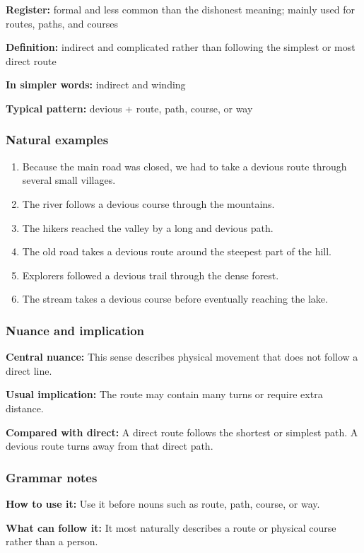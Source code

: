 \documentclass[11pt]{article}
\begin{document}
\textbf{Register:} formal and less common than the dishonest meaning; mainly used for routes, paths, and courses

\textbf{Definition:} indirect and complicated rather than following the simplest or most direct route

\textbf{In simpler words:} indirect and winding

\textbf{Typical pattern:} devious + route, path, course, or way

\subsubsection{Natural examples}
\begin{enumerate}
  \item Because the main road was closed, we had to take a devious route through several small villages.
  \item The river follows a devious course through the mountains.
  \item The hikers reached the valley by a long and devious path.
  \item The old road takes a devious route around the steepest part of the hill.
  \item Explorers followed a devious trail through the dense forest.
  \item The stream takes a devious course before eventually reaching the lake.
\end{enumerate}

\subsubsection{Nuance and implication}
\textbf{Central nuance:} This sense describes physical movement that does not follow a direct line.

\textbf{Usual implication:} The route may contain many turns or require extra distance.

\textbf{Compared with direct:} A direct route follows the shortest or simplest path. A devious route turns away from that direct path.

\subsubsection{Grammar notes}
\textbf{How to use it:} Use it before nouns such as route, path, course, or way.

\textbf{What can follow it:} It most naturally describes a route or physical course rather than a person.
\end{document}

